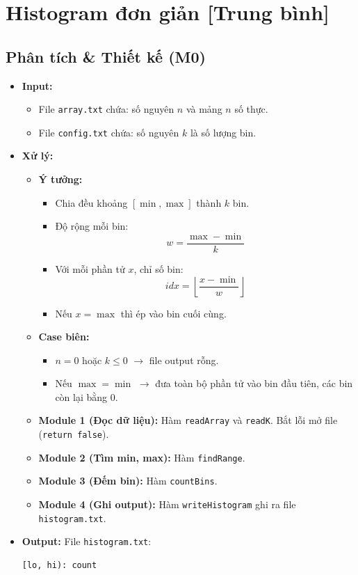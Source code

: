 \section{Histogram đơn giản [Trung bình]}

\subsection{Phân tích \& Thiết kế (M0)}
\begin{itemize}
    \item \textbf{Input:}
    \begin{itemize}
        \item File \texttt{array.txt} chứa: số nguyên $n$ và mảng $n$ số thực.
        \item File \texttt{config.txt} chứa: số nguyên $k$ là số lượng bin.
    \end{itemize}

    \item \textbf{Xử lý:}
    \begin{itemize}
        \item \textbf{Ý tưởng:}
        \begin{itemize}
            \item Chia đều khoảng $[\min, \max]$ thành $k$ bin.
            \item Độ rộng mỗi bin:
            \[
            w = \frac{\max - \min}{k}
            \]
            \item Với mỗi phần tử $x$, chỉ số bin:
            \[
            idx = \left\lfloor \frac{x - \min}{w} \right\rfloor
            \]
            \item Nếu $x = \max$ thì ép vào bin cuối cùng.
        \end{itemize}

        \item \textbf{Case biên:}
        \begin{itemize}
            \item $n = 0$ hoặc $k \le 0$ $\rightarrow$ file output rỗng.
            \item Nếu $\max = \min$ $\rightarrow$ đưa toàn bộ phần tử vào bin đầu tiên, các bin còn lại bằng 0.
        \end{itemize}

        \item \textbf{Module 1 (Đọc dữ liệu):} Hàm \texttt{readArray} và \texttt{readK}. Bắt lỗi mở file (\texttt{return false}).
        \item \textbf{Module 2 (Tìm min, max):} Hàm \texttt{findRange}.
        \item \textbf{Module 3 (Đếm bin):} Hàm \texttt{countBins}.
        \item \textbf{Module 4 (Ghi output):} Hàm \texttt{writeHistogram} ghi ra file \texttt{histogram.txt}.
    \end{itemize}

    \item \textbf{Output:}
    File \texttt{histogram.txt}:
\begin{lstlisting}
[lo, hi): count
\end{lstlisting}
\end{itemize}

